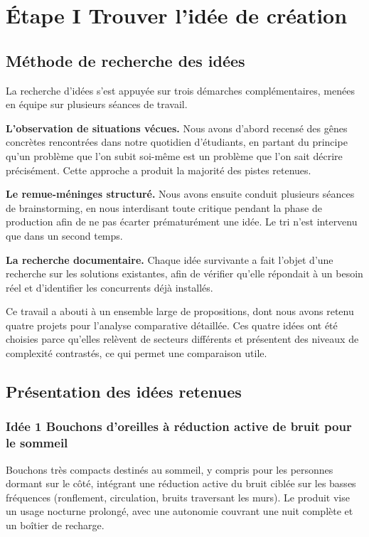 \section{Étape I \textendash{} Trouver l'idée de création}

\subsection{Méthode de recherche des idées}

La recherche d'idées s'est appuyée sur trois démarches complémentaires, menées
en équipe sur plusieurs séances de travail.

\textbf{L'observation de situations vécues.} Nous avons d'abord recensé des
gênes concrètes rencontrées dans notre quotidien d'étudiants, en partant du
principe qu'un problème que l'on subit soi-même est un problème que l'on sait
décrire précisément. Cette approche a produit la majorité des pistes retenues.

\textbf{Le remue-méninges structuré.} Nous avons ensuite conduit plusieurs
séances de brainstorming, en nous interdisant toute critique pendant la phase de
production afin de ne pas écarter prématurément une idée. Le tri n'est intervenu
que dans un second temps.

\textbf{La recherche documentaire.} Chaque idée survivante a fait l'objet d'une
recherche sur les solutions existantes, afin de vérifier qu'elle répondait à un
besoin réel et d'identifier les concurrents déjà installés.

Ce travail a abouti à un ensemble large de propositions, dont nous avons retenu
quatre projets pour l'analyse comparative détaillée. Ces quatre idées ont été
choisies parce qu'elles relèvent de secteurs différents et présentent des
niveaux de complexité contrastés, ce qui permet une comparaison utile.

\subsection{Présentation des idées retenues}

\subsubsection{Idée 1 \textendash{} Bouchons d'oreilles à réduction active de bruit pour le sommeil}

Bouchons très compacts destinés au sommeil, y compris pour les personnes dormant
sur le côté, intégrant une réduction active du bruit ciblée sur les basses
fréquences (ronflement, circulation, bruits traversant les murs). Le produit vise
un usage nocturne prolongé, avec une autonomie couvrant une nuit complète et un
boîtier de recharge.

